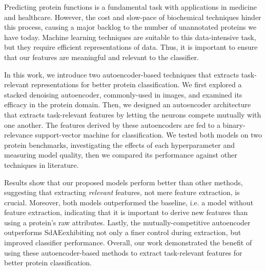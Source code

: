 %
%
%
%
%

\par Predicting protein functions is a fundamental task with applications in
medicine and healthcare. However, the cost and slow-pace of biochemical
techniques hinder this process, causing a major backlog to the number of
unannotated proteins we have today. Machine learning techniques are suitable to
this data-intensive task, but they require efficient representations of data.
Thus, it is important to ensure that our features are meaningful and relevant
to the classifier. 

\par In this work, we introduce two autoencoder-based techniques that extracts
task-relevant representations for better protein classification. We first
explored a stacked denoising autoencoder, commonly-used in images, and examined
its efficacy in the protein domain. Then, we designed an autoencoder
architecture that extracts task-relevant features by letting the neurons
compete mutually with one another. The features derived by these autoencoders
are fed to a binary-relevance support-vector machine for classification.  We
tested both models on two protein benchmarks, investigating the effects of each
hyperparameter and measuring model quality, then we compared its performance
against other techniques in literature.

\par Results show that our proposed models perform better than other methods,
suggesting that extracting \emph{relevant} features, not mere feature
extraction, is crucial. Moreover, both models outperformed the baseline, i.e. a
model without feature extraction, indicating that it is important to derive
new features than using a protein's raw attributes.  Lastly, the
mutually-competitive autoencoder outperforms SdAE\textemdash exhibiting not
only a finer control during extraction, but improved classifier performance.
Overall, our work demonstrated the benefit of using these autoencoder-based
methods to extract task-relevant features for better protein classification.
